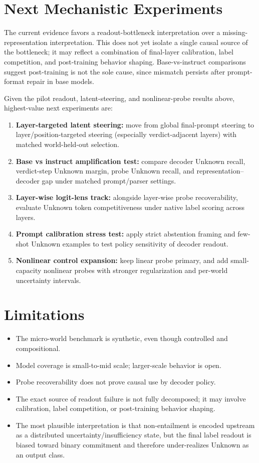 \documentclass[11pt]{article}
\begin{document}
\section{Next Mechanistic Experiments}
The current evidence favors a readout-bottleneck interpretation over a missing-representation interpretation.
This does not yet isolate a single causal source of the bottleneck; it may reflect a combination of final-layer calibration, label competition, and post-training behavior shaping.
Base-vs-instruct comparisons suggest post-training is not the sole cause, since mismatch persists after prompt-format repair in base models.

Given the pilot readout, latent-steering, and nonlinear-probe results above, highest-value next experiments are:
\begin{enumerate}
  \item \textbf{Layer-targeted latent steering:} move from global final-prompt steering to layer/position-targeted steering (especially verdict-adjacent layers) with matched world-held-out selection.
  \item \textbf{Base vs instruct amplification test:} compare decoder Unknown recall, verdict-step Unknown margin, probe Unknown recall, and representation--decoder gap under matched prompt/parser settings.
  \item \textbf{Layer-wise logit-lens track:} alongside layer-wise probe recoverability, evaluate Unknown token competitiveness under native label scoring across layers.
  \item \textbf{Prompt calibration stress test:} apply strict abstention framing and few-shot Unknown examples to test policy sensitivity of decoder readout.
  \item \textbf{Nonlinear control expansion:} keep linear probe primary, and add small-capacity nonlinear probes with stronger regularization and per-world uncertainty intervals.
\end{enumerate}

\section{Limitations}
\begin{itemize}
  \item The micro-world benchmark is synthetic, even though controlled and compositional.
  \item Model coverage is small-to-mid scale; larger-scale behavior is open.
  \item Probe recoverability does not prove causal use by decoder policy.
  \item The exact source of readout failure is not fully decomposed; it may involve calibration, label competition, or post-training behavior shaping.
  \item The most plausible interpretation is that non-entailment is encoded upstream as a distributed uncertainty/insufficiency state, but the final label readout is biased toward binary commitment and therefore under-realizes Unknown as an output class.
\end{itemize}
\end{document}
